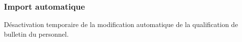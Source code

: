 \documentclass[letterpaper,10pt,english]{sphinxmanual}
\begin{document}
\subsubsection{Import automatique}
\label{\detokenize{maj/maj_30092019:import-automatique}}
Désactivation temporaire de la modification automatique de la qualification de bulletin du personnel.



\renewcommand{\indexname}{Index}
\printindex
\end{document}
